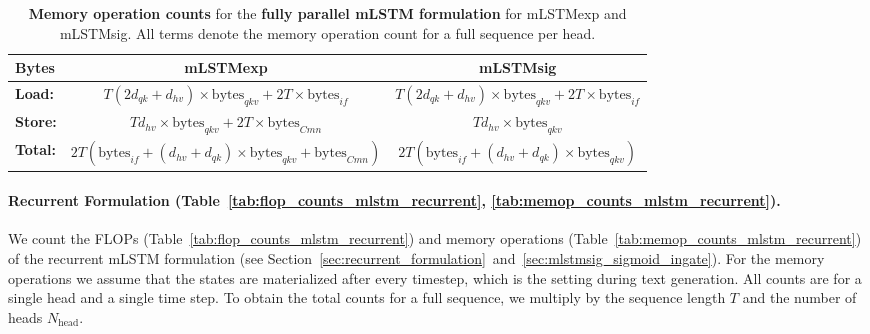 \documentclass{article}
\begin{document}
    \begin{table}[htbp]
        \vspace{-0.3cm}
        \centering
        \caption{\label{tab:memop_counts_mlstm_parallel} \textbf{Memory operation counts} for the \textbf{fully parallel mLSTM formulation} for mLSTMexp and mLSTMsig.
            All terms denote the memory operation count for a full sequence per head.}
        \vspace{0.2cm}
        \begin{adjustbox}{width=\textwidth}
        \begin{tabular}{lcc}
            \toprule
            Bytes           & mLSTMexp                                                                                     & mLSTMsig                                                                       \\
            \midrule
            \textbf{Load:}  & $T (2d_{qk} + d_{hv}) \times \text{bytes}_{qkv} + 2T \times \text{bytes}_{if}$               & $T (2d_{qk} + d_{hv}) \times \text{bytes}_{qkv} + 2T \times \text{bytes}_{if}$ \\
            \textbf{Store:} & $T d_{hv} \times \text{bytes}_{qkv} + 2 T \times \text{bytes}_{Cmn}$                         & $T d_{hv} \times \text{bytes}_{qkv}$                                           \\
            \midrule[0.75pt]
            \textbf{Total:} & $2 T (\text{bytes}_{if} + (d_{hv} + d_{qk}) \times \text{bytes}_{qkv} + \text{bytes}_{Cmn})$ & $2 T (\text{bytes}_{if} + (d_{hv} + d_{qk}) \times \text{bytes}_{qkv})$        \\
            \bottomrule
        \end{tabular}
        \end{adjustbox}
        \vspace{-0.2cm}
    \end{table}


    \paragraph{Recurrent Formulation (Table~\ref{tab:flop_counts_mlstm_recurrent}, \ref{tab:memop_counts_mlstm_recurrent}).}
    We count the FLOPs (Table~\ref{tab:flop_counts_mlstm_recurrent}) and memory operations (Table~\ref{tab:memop_counts_mlstm_recurrent}) of the recurrent mLSTM formulation (see Section~\ref{sec:recurrent_formulation}~and~\ref{sec:mlstmsig_sigmoid_ingate}).
    For the memory operations we assume that the states are materialized after every timestep, which is the setting during text generation.
    All counts are for a single head and a single time step.
    To obtain the total counts for a full sequence, we multiply by the sequence length $T$ and the number of heads $N_\text{head}$.
\end{document}
